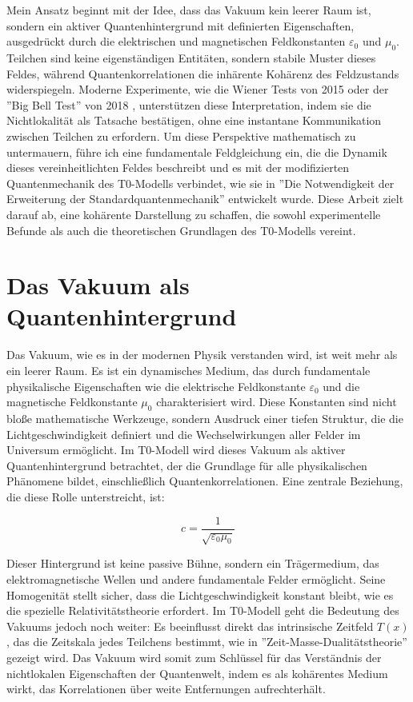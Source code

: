 \documentclass[a4paper,12pt]{article}
\newcommand{\Tfield}{T(x)}
\theoremstyle{definition}
\theoremstyle{remark}
\begin{document}
	Mein Ansatz beginnt mit der Idee, dass das Vakuum kein leerer Raum ist, sondern ein aktiver Quantenhintergrund mit definierten Eigenschaften, ausgedrückt durch die elektrischen und magnetischen Feldkonstanten \(\varepsilon_0\) und \(\mu_0\). Teilchen sind keine eigenständigen Entitäten, sondern stabile Muster dieses Feldes, während Quantenkorrelationen die inhärente Kohärenz des Feldzustands widerspiegeln. Moderne Experimente, wie die Wiener Tests von 2015 \cite{Giustina2015} oder der ''Big Bell Test'' von 2018 \cite{BigBellTest2018}, unterstützen diese Interpretation, indem sie die Nichtlokalität als Tatsache bestätigen, ohne eine instantane Kommunikation zwischen Teilchen zu erfordern. Um diese Perspektive mathematisch zu untermauern, führe ich eine fundamentale Feldgleichung ein, die die Dynamik dieses vereinheitlichten Feldes beschreibt und es mit der modifizierten Quantenmechanik des T0-Modells verbindet, wie sie in ''Die Notwendigkeit der Erweiterung der Standardquantenmechanik'' \cite{pascher_quantum_2025} entwickelt wurde. Diese Arbeit zielt darauf ab, eine kohärente Darstellung zu schaffen, die sowohl experimentelle Befunde als auch die theoretischen Grundlagen des T0-Modells vereint.
	
	\section{Das Vakuum als Quantenhintergrund}
	
	Das Vakuum, wie es in der modernen Physik verstanden wird, ist weit mehr als ein leerer Raum. Es ist ein dynamisches Medium, das durch fundamentale physikalische Eigenschaften wie die elektrische Feldkonstante \(\varepsilon_0\) und die magnetische Feldkonstante \(\mu_0\) charakterisiert wird. Diese Konstanten sind nicht bloße mathematische Werkzeuge, sondern Ausdruck einer tiefen Struktur, die die Lichtgeschwindigkeit definiert und die Wechselwirkungen aller Felder im Universum ermöglicht. Im T0-Modell wird dieses Vakuum als aktiver Quantenhintergrund betrachtet, der die Grundlage für alle physikalischen Phänomene bildet, einschließlich Quantenkorrelationen. Eine zentrale Beziehung, die diese Rolle unterstreicht, ist:
	
	\begin{equation}
		c = \frac{1}{\sqrt{\varepsilon_0 \mu_0}}
	\end{equation}
	
	Dieser Hintergrund ist keine passive Bühne, sondern ein Trägermedium, das elektromagnetische Wellen und andere fundamentale Felder ermöglicht. Seine Homogenität stellt sicher, dass die Lichtgeschwindigkeit konstant bleibt, wie es die spezielle Relativitätstheorie erfordert. Im T0-Modell geht die Bedeutung des Vakuums jedoch noch weiter: Es beeinflusst direkt das intrinsische Zeitfeld \(\Tfield\), das die Zeitskala jedes Teilchens bestimmt, wie in ''Zeit-Masse-Dualitätstheorie'' \cite{pascher_params_2025} gezeigt wird. Das Vakuum wird somit zum Schlüssel für das Verständnis der nichtlokalen Eigenschaften der Quantenwelt, indem es als kohärentes Medium wirkt, das Korrelationen über weite Entfernungen aufrechterhält.
	
\end{document}
